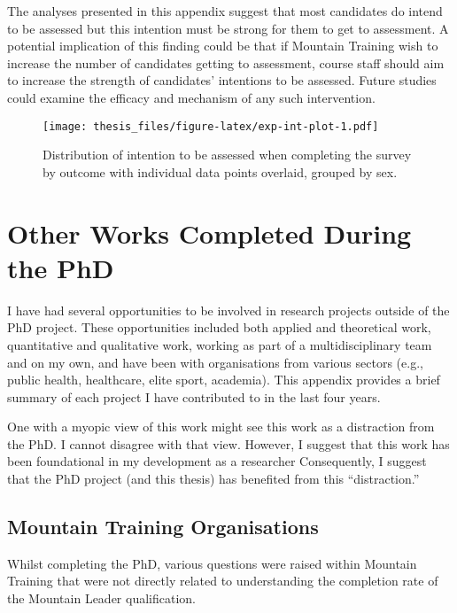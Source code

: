 \documentclass[
  12pt,
  a4paper,
]{book}
\begin{document}
The analyses presented in this appendix suggest that most candidates do intend to be assessed but this intention must be strong for them to get to assessment. A potential implication of this finding could be that if Mountain Training wish to increase the number of candidates getting to assessment, course staff should aim to increase the strength of candidates' intentions to be assessed. Future studies could examine the efficacy and mechanism of any such intervention.

\begin{figure}
\centering
\texttt{[image: thesis\_files/figure-latex/exp-int-plot-1.pdf]}
\caption{\label{fig:exp-int-plot}Distribution of intention to be assessed when completing the survey by outcome with individual data points overlaid, grouped by sex.}
\end{figure}

\hypertarget{other-works}{%
\chapter{Other Works Completed During the PhD}\label{other-works}}

I have had several opportunities to be involved in research projects outside of the PhD project. These opportunities included both applied and theoretical work, quantitative and qualitative work, working as part of a multidisciplinary team and on my own, and have been with organisations from various sectors (e.g., public health, healthcare, elite sport, academia). This appendix provides a brief summary of each project I have contributed to in the last four years.

One with a myopic view of this work might see this work as a distraction from the PhD. I cannot disagree with that view. However, I suggest that this work has been foundational in my development as a researcher Consequently, I suggest that the PhD project (and this thesis) has benefited from this ``distraction.''

\hypertarget{mountain-training-organisations}{%
\section{Mountain Training Organisations}\label{mountain-training-organisations}}

Whilst completing the PhD, various questions were raised within Mountain Training that were not directly related to understanding the completion rate of the Mountain Leader qualification.
\end{document}
